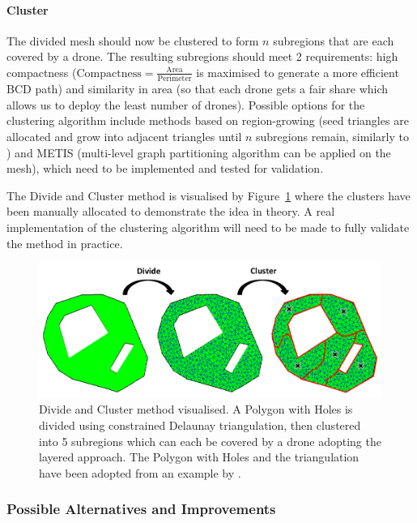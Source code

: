 \paragraph{Cluster} The divided mesh should now be clustered to form $n$ subregions that are each covered by a drone. The resulting subregions should meet 2 requirements: high compactness ($\mathrm{Compactness} = \frac{\mathrm{Area}}{\mathrm{Perimeter}}$ is maximised to generate a more efficient \gls{BCD} path) and similarity in area (so that each drone gets a fair share which allows us to deploy the least number of drones). Possible options for the clustering algorithm include methods based on region-growing (seed triangles are allocated and grow into adjacent triangles until $n$ subregions remain, similarly to \cite{skorobogatov2021multi}) and METIS \cite{karypis1997metis} (multi-level graph partitioning algorithm can be applied on the mesh), which need to be implemented and tested for validation. 

The Divide and Cluster method is visualised by Figure~\ref{fig:msp_divide_cluster} where the clusters have been manually allocated to demonstrate the idea in theory. A real implementation of the clustering algorithm will need to be made to fully validate the method in practice. 

\begin{figure}[h!]
    \centering
    \includegraphics[width=\linewidth]{figs/Jihwan/Divide and Cluster.png}
    \caption[Divide and Cluster Method]
    {Divide and Cluster method visualised. A Polygon with Holes is divided using constrained Delaunay triangulation, then clustered into 5 subregions which can each be covered by a drone adopting the layered approach. The Polygon with Holes and the triangulation have been adopted from an example by \cite{cgal2024triangulation}.}
    \label{fig:msp_divide_cluster}
\end{figure}

\subsubsection{Possible Alternatives and Improvements}


